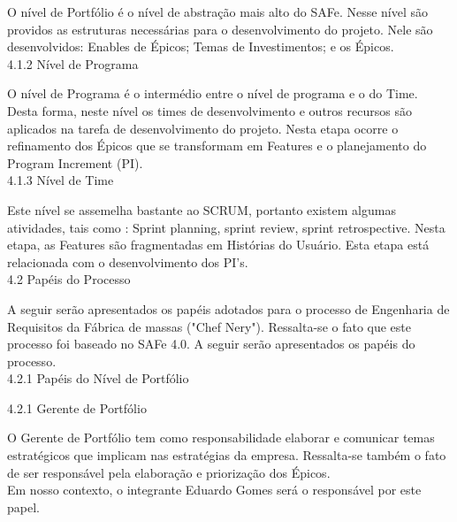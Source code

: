 \tab O nível de Portfólio é o nível de abstração mais alto do SAFe. Nesse nível são providos as estruturas necessárias para o desenvolvimento do projeto.  Nele são desenvolvidos: Enables de Épicos; Temas de Investimentos; e os Épicos. \\




{\large{4.1.2 Nível de Programa\\}}

 \tab O nível de Programa é o intermédio entre o nível de programa e o do Time. Desta forma, neste nível os times de desenvolvimento e outros recursos são aplicados na tarefa de desenvolvimento do projeto.  Nesta etapa ocorre o refinamento dos Épicos que se transformam em Features e o planejamento do Program Increment (PI).\\



{\large{4.1.3 Nível de Time\\}}

\tab Este nível se assemelha bastante ao SCRUM,  portanto existem algumas atividades, tais como : Sprint planning, sprint review, sprint retrospective. Nesta etapa, as Features são fragmentadas em Histórias do Usuário. Esta etapa está relacionada com o desenvolvimento dos PI’s. \\



{\large{4.2 Papéis do Processo\\}}

\tab A seguir serão apresentados os papéis adotados para o processo de Engenharia de Requisitos da Fábrica de massas ("Chef Nery"). Ressalta-se o fato que este processo foi baseado no SAFe 4.0. A seguir serão apresentados os papéis do processo.\\




{\large{4.2.1 Papéis do Nível de Portfólio\\}}


{\large{4.2.1 Gerente de Portfólio\\}}

\tab O Gerente de Portfólio tem como responsabilidade elaborar e comunicar temas estratégicos que implicam nas estratégias da empresa. Ressalta-se também o fato de ser responsável pela elaboração e priorização dos Épicos. \\
\tab Em nosso contexto, o integrante Eduardo Gomes será o responsável por este papel. \\




